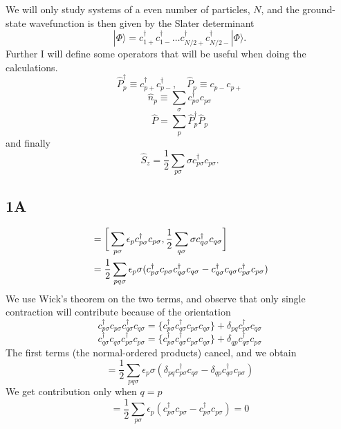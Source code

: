 \documentclass[norsk,a4paper,12pt]{article}
\begin{document}
We will only study systems of a even number of particles, $N$, and the ground-state wavefunction is then given by the Slater determinant
\begin{equation}
|\Phi\rangle=c_{1+}^{\dagger}c_{1-}^{\dagger}\hdots c_{N/2 +}^{\dagger}c_{N/2 -}^{\dagger}|\Phi\rangle.
\end{equation}
Further I will define some operators that will be useful when doing the calculations. 
\begin{equation}
\hat{P}_p^{\dagger}\equiv c_{p+}^{\dagger}c_{p-}^{\dagger},\quad \hat{P}_p\equiv c_{p-}c_{p+}
\end{equation}
\begin{equation}
\hat{n}_p\equiv\sum_{\sigma}c_{p\sigma}^{\dagger}c_{p\sigma}
\end{equation}
\begin{equation}
\hat{P}=\sum_p\hat{P}_p^{\dagger}\hat{P}_p
\end{equation}
and finally
\begin{equation}
\hat{S}_z=\frac{1}{2}\sum_{p\sigma}\sigma c_{p\sigma}^{\dagger}c_{p\sigma}.
\end{equation}

\subsection*{1A}
\begin{align}
[\hat{H}_0,\hat{S}_z]&=\bigg[\sum_{p\sigma}\epsilon_pc_{p\sigma}^{\dagger}c_{p\sigma},\frac{1}{2}\sum_{q\sigma}\sigma c_{q\sigma}^{\dagger}c_{q\sigma}\bigg]\notag\\
&=\frac{1}{2}\sum_{pq\sigma}\epsilon_{p}\sigma(c_{p\sigma}^{\dagger}c_{p\sigma}c_{q\sigma}^{\dagger}c_{q\sigma}-c_{q\sigma}^{\dagger}c_{q\sigma}c_{p\sigma}^{\dagger}c_{p\sigma})
\end{align}
We use Wick's theorem on the two terms, and observe that only single contraction will contribute because of the orientation
\begin{equation}
c_{p\sigma}^{\dagger}c_{p\sigma}c_{q\sigma}^{\dagger}c_{q\sigma}=\{c_{p\sigma}^{\dagger}c_{q\sigma}^{\dagger}c_{p\sigma}c_{q\sigma}\}+\delta_{pq}c_{p\sigma}^{\dagger}c_{q\sigma}
\end{equation}
\begin{equation}
c_{q\sigma}^{\dagger}c_{q\sigma}c_{p\sigma}^{\dagger}c_{p\sigma}=\{c_{p\sigma}^{\dagger}c_{q\sigma}^{\dagger}c_{p\sigma}c_{q\sigma}\}+\delta_{qp}c_{q\sigma}^{\dagger}c_{p\sigma}
\end{equation}
The first terms (the normal-ordered products) cancel, and we obtain
\begin{equation}
[\hat{H}_0,\hat{S}_z]=\frac{1}{2}\sum_{pq\sigma}\epsilon_p\sigma(\delta_{pq}c_{p\sigma}^{\dagger}c_{q\sigma}-\delta_{qp}c_{q\sigma}^{\dagger}c_{p\sigma})
\end{equation}
We get contribution only when $q=p$
\begin{equation}
[\hat{H}_0,\hat{S}_z]=\frac{1}{2}\sum_{p\sigma}\epsilon_p(c_{p\sigma}^{\dagger}c_{p\sigma}-c_{p\sigma}^{\dagger}c_{p\sigma})=0
\end{equation}
\end{document}
